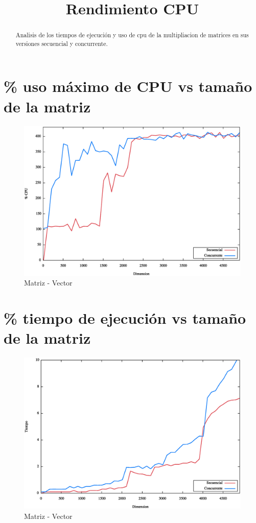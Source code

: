 
\title{Rendimiento CPU}


\maketitle
\begin{abstract}
    \centering
    Analisis de los tiempos de ejecución y uso de cpu de la multipliacion de matrices en sus
    versiones secuencial y concurrente.
\end{abstract}
\section{\% uso máximo de CPU vs tamaño de la matriz}
\begin{figure}[h]
    \centering
    \includegraphics[scale=.5]{vectordimensioncpu.eps}
    \caption{Matriz - Vector}
    \label{fig:digraph}
\end{figure}
\newpage
\section{\% tiempo de ejecución vs tamaño de la matriz}
\begin{figure}[h]
    \centering
    \includegraphics[scale=.5]{vectordimensiontiempo.eps}
    \caption{Matriz - Vector}
    \label{fig:digraph}
\end{figure}
\newpage
